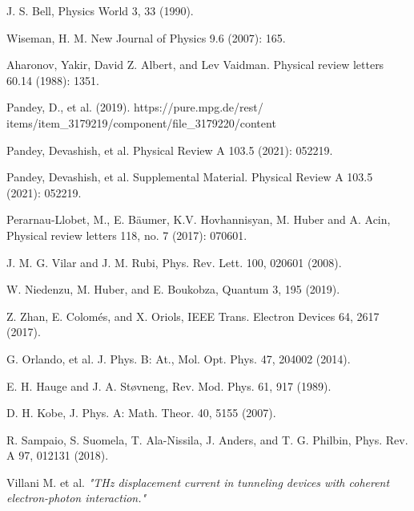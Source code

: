 \documentclass[11pt, a4paper]{article} %
\begin{document}
\begin{thebibliography}{1}
{
J. S. Bell, Physics World 3, 33 (1990).

Wiseman, H. M. New Journal of Physics 9.6 (2007): 165.

Aharonov, Yakir, David Z. Albert, and Lev Vaidman. Physical review letters 60.14 (1988): 1351.

Pandey, D., et al. (2019). https://pure.mpg.de/rest/\\ items/item\_3179219/component/file\_3179220/content

Pandey, Devashish, et al. Physical Review A 103.5 (2021): 052219.

Pandey, Devashish, et al. Supplemental Material. Physical Review A 103.5 (2021): 052219.

Perarnau-Llobet, M., E. Bäumer, K.V. Hovhannisyan, M. Huber and A. Acin, Physical review letters 118, no. 7 (2017): 070601.

J. M. G. Vilar and J. M. Rubi, Phys. Rev. Lett. 100, 020601 (2008).

W. Niedenzu, M. Huber, and E. Boukobza, Quantum 3, 195 (2019).

Z. Zhan, E. Colomés, and X. Oriols, IEEE Trans. Electron Devices 64, 2617 (2017).

G. Orlando, et al. J. Phys. B: At., Mol. Opt. Phys. 47, 204002 (2014).

E. H. Hauge and J. A. Støvneng, Rev. Mod. Phys. 61, 917 (1989).

D. H. Kobe, J. Phys. A: Math. Theor. 40, 5155 (2007).

R. Sampaio, S. Suomela, T. Ala-Nissila, J. Anders, and T. G. Philbin, Phys. Rev. A 97, 012131 (2018).

Villani M. et al. {\em "THz displacement current in tunneling devices with coherent electron-photon
interaction."}

}
\end{thebibliography}
\end{document}
